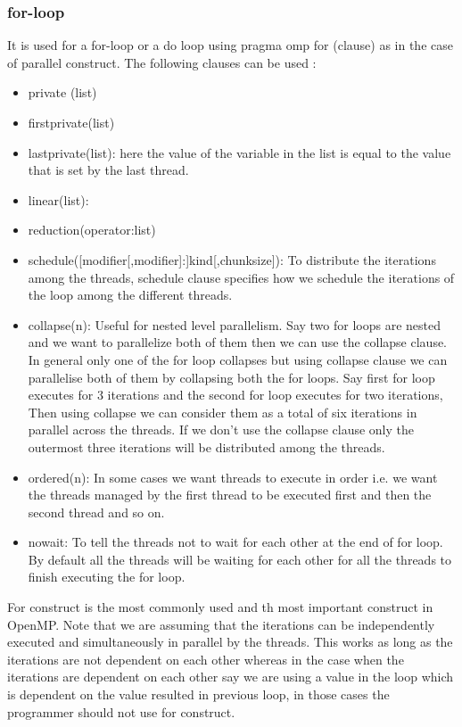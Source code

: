 \documentclass[12pt]{article}
\begin{document}
\subsubsection{for-loop}
It is used for a for-loop or a do loop using pragma omp for (clause) as in the case of parallel construct.
The following clauses can be used :
\begin{itemize}
\item private (list)
\item firstprivate(list)
\item lastprivate(list): here the value of the variable in the list is equal to the value that is set by the last thread.
\item linear(list):
\item reduction(operator:list)
\item schedule([modifier[,modifier]:]kind[,chunksize]): To 
distribute the iterations among 
the threads, schedule clause specifies how 
we schedule the iterations of the loop among the different threads.
\item collapse(n): Useful for nested level parallelism. Say two for loops are nested and we want to parallelize both of them then we can use the collapse clause. In general only one of the 
for loop collapses but using collapse clause we can parallelise both of them by collapsing both the for loops. Say first for loop executes for 3 iterations and the second for loop executes for two iterations, Then
using collapse we can consider them as a total of six iterations in parallel across the threads. If we don't use the collapse clause only the outermost three iterations will be distributed among the threads.
\item ordered(n): In some cases we want threads to execute in order i.e. we want the threads managed by the first thread to be executed first and then the second thread and so on.
\item nowait: To tell the threads not to wait for each other at the end of for loop. By default all the threads will be waiting for each other for all the threads to finish executing the for loop.
\end{itemize}
For construct is the most commonly used and th most important construct in OpenMP.
Note that we are assuming that the iterations can be independently executed and simultaneously in parallel by the threads.
This works as long as the iterations are not dependent on each other whereas in the case when the iterations are dependent on each other say we are using a value in the loop which is dependent on the value resulted in previous loop,
in those cases the programmer should not use for construct.
\end{document}
